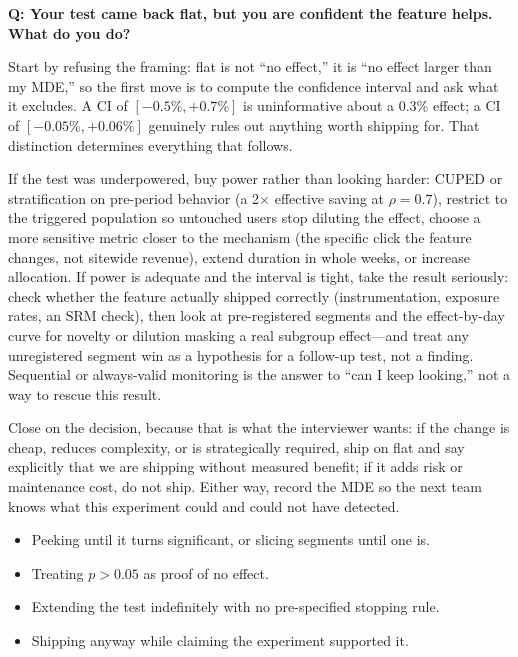 \begin{interviewq}
\textbf{Q: Your test came back flat, but you are confident the feature helps. What do you do?}

 \quad {} \quad \badgefreq{\freqhigh}

\stronganswer

Start by refusing the framing: flat is not ``no effect,'' it is ``no effect larger than my MDE,'' so the first move is to compute the confidence interval and ask what it excludes. A CI of $[-0.5\%, +0.7\%]$ is uninformative about a 0.3\% effect; a CI of $[-0.05\%, +0.06\%]$ genuinely rules out anything worth shipping for. That distinction determines everything that follows.

If the test was underpowered, buy power rather than looking harder: CUPED or stratification on pre-period behavior (a 2$\times$ effective saving at $\rho = 0.7$), restrict to the triggered population so untouched users stop diluting the effect, choose a more sensitive metric closer to the mechanism (the specific click the feature changes, not sitewide revenue), extend duration in whole weeks, or increase allocation. If power is adequate and the interval is tight, take the result seriously: check whether the feature actually shipped correctly (instrumentation, exposure rates, an SRM check), then look at pre-registered segments and the effect-by-day curve for novelty or dilution masking a real subgroup effect---and treat any unregistered segment win as a hypothesis for a follow-up test, not a finding. Sequential or always-valid monitoring is the answer to ``can I keep looking,'' not a way to rescue this result.

Close on the decision, because that is what the interviewer wants: if the change is cheap, reduces complexity, or is strategically required, ship on flat and say explicitly that we are shipping without measured benefit; if it adds risk or maintenance cost, do not ship. Either way, record the MDE so the next team knows what this experiment could and could not have detected.

\redflags
\begin{itemize}
    \item Peeking until it turns significant, or slicing segments until one is.
    \item Treating $p > 0.05$ as proof of no effect.
    \item Extending the test indefinitely with no pre-specified stopping rule.
    \item Shipping anyway while claiming the experiment supported it.
\end{itemize}


\end{interviewq}
